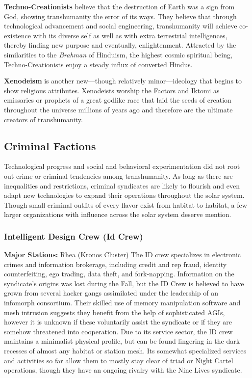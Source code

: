 \textbf{Techno-Creationists} believe that the destruction of 
Earth was a sign from God, showing transhumanity 
the error of its ways. They believe that through technological advancement and social engineering, transhumanity will achieve co-existence with its diverse self 
as well as with extra terrestrial intelligences, thereby 
finding new purpose and eventually, enlightenment. 
Attracted by the similarities to the \textit{Brahman }of Hinduism, the highest cosmic spiritual being, Techno-Creationists enjoy a steady influx of converted Hindus.

\textbf{Xenodeism} is another new—though relatively 
minor—ideology that begins to show religious attributes. Xenodeists worship the Factors and Iktomi 
as emissaries or prophets of a great godlike race that 
laid the seeds of creation throughout the universe 
millions of years ago and therefore are the ultimate 
creators of transhumanity.

\subsection{Criminal Factions}

Technological progress and social and behavioral 
experimentation did not root out crime or criminal 
tendencies among transhumanity. As long as there 
are inequalities and restrictions, criminal syndicates are likely to flourish and even adapt new 
technologies to expand their operations throughout the solar system. Though small criminal outfits 
of every flavor exist from habitat to habitat, a few 
larger organizations with influence across the solar 
system deserve mention.

\subsubsection{Intelligent Design Crew (Id Crew)}

\textbf{Major Stations:} Rhea (Kronos Cluster)
The ID crew specializes in electronic crimes and information brokerage, including credit and rep fraud, 
identity counterfeiting, ego trading, data theft, and 
fork-napping. Information on the syndicate's origins 
was lost during the Fall, but the ID Crew is believed 
to have grown from several hacker gangs assimilated 
under the leadership of an infomorph consortium. 
Their skilled use of memory manipulation software 
and mesh intrusion suggests they benefit from the 
help of sophisticated AGIs, however it is unknown 
if these voluntarily assist the syndicate or if they are 
somehow threatened into cooperation. Due to its 
service sector, the ID crew maintains a minimalist 
physical profile, but can be found lingering in the 
dark recesses of almost any habitat or station mesh. 
Its somewhat specialized services and activities so 
far allow them to mostly stay clear of triad or Night 
Cartel operations, though they have an ongoing rivalry with the Nine Lives syndicate.

